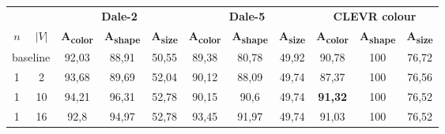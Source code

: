 \begin{table}[ht]
    \centering
    \begin{tabular}{cc|ccc|ccc|ccc}
        \toprule
                                      &         & \multicolumn{3}{c}{\textbf{Dale-2}} & \multicolumn{3}{c}{\textbf{Dale-5}} & \multicolumn{3}{c}{\textbf{CLEVR colour}}                                                                                                                                                                                                           \\  \cmidrule(lr){3-5}\cmidrule(lr){6-8}\cmidrule(lr){9-11}
        $n$                           & $|V|$   & \textbf{A\textsubscript{color}}     & \textbf{A\textsubscript{shape}}     & \textbf{A\textsubscript{size}}            & \textbf{A\textsubscript{color}} & \textbf{A\textsubscript{shape}} & \textbf{A\textsubscript{size}} & \textbf{A\textsubscript{color}} & \textbf{A\textsubscript{shape}} & \textbf{A\textsubscript{size}} \\\midrule
        \multicolumn{2}{c|}{baseline} & {92,03} & {88,91}                             & {50,55}                             & {89,38}                                   & {80,78}                         & {49,92}                         & {90,78}                        & {100}                           & {76,72}                                                          \\\midrule
        {1}                           & {2}     & {93,68}                             & {89,69}                             & {52,04}                                   & {90,12}                         & {88,09}                         & {49,74}                        & {87,37}                         & {100}                           & {76,56}                        \\
        {1}                           & {10}    & {94,21}                             & {96,31}                             & {52,78}                                   & {90,15}                         & {90,6}                          & {49,74}                        & \textbf{91,32}                  & {100}                           & {76,52}                        \\
        {1}                           & {16}    & {92,8}                              & {94,97}                             & {52,78}                                   & {93,45}                         & {91,97}                         & {49,74}                        & {91,03}                         & {100}                           & {76,52}                        \\

\end{tabular}
\end{table}
